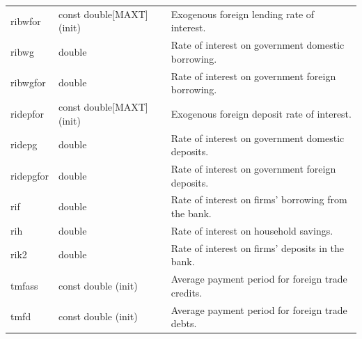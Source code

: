 \documentclass{article}
\begin{document}
\begin{longtable}{p{}p{}p{}}
ribwfor & const double[MAXT] (init) & Exogenous foreign lending rate of interest.\\
ribwg & double & Rate of interest on government domestic borrowing.\\
ribwgfor & double & Rate of interest on government foreign borrowing.\\
ridepfor & const double[MAXT] (init) & Exogenous foreign deposit rate of interest.\\
ridepg & double & Rate of interest on government domestic deposits.\\
ridepgfor & double & Rate of interest on government foreign deposits.\\
rif & double & Rate of interest on firms' borrowing from the bank.\\
rih & double & Rate of interest on household savings.\\
rik2 & double & Rate of interest on firms' deposits in the bank.\\
tmfass & const double (init) & Average payment period for foreign trade credits.\\
tmfd & const double (init) & Average payment period for foreign trade debts.\\
\midrule


\end{longtable}
\end{document}
